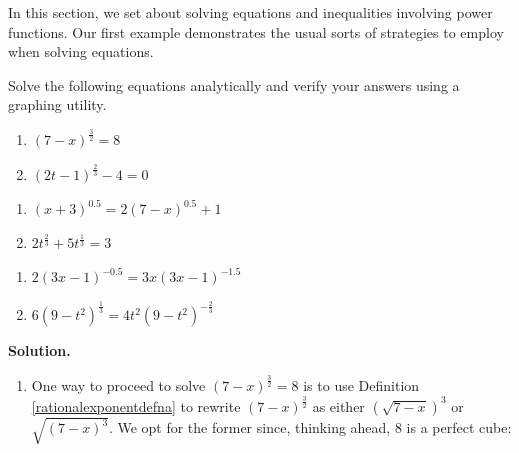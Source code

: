 

\setcounter{footnote}{0}

\label{PowerEqIneq}

In this section, we set about solving equations and inequalities involving power functions.  Our first example demonstrates the usual sorts of strategies to employ when solving equations.

\begin{ex} \label{powerequationex}  Solve the following equations analytically and verify your answers using a graphing utility.


\begin{multicols}{2}
\begin{enumerate}

\item \label{first} $(7-x)^{\frac{3}{2}} = 8$ 
\item \label{second} $(2t-1)^{\frac{2}{3}} -4 = 0$

\setcounter{HW}{\value{enumi}}
\end{enumerate}
\end{multicols}

\begin{multicols}{2}
\begin{enumerate}
\setcounter{enumi}{\value{HW}}

\item $(x+3)^{0.5} = 2(7-x)^{0.5}+1$ 
\item $2t^{\frac{2}{3}} + 5t^{\frac{1}{3}} = 3$

\setcounter{HW}{\value{enumi}}
\end{enumerate}
\end{multicols}


\begin{multicols}{2}
\begin{enumerate}
\setcounter{enumi}{\value{HW}}

\item $2(3x-1)^{-0.5}  = 3x (3x-1)^{-1.5}$ 
\item $6(9-t^2)^{\frac{1}{3}} = 4t^2 (9-t^2)^{-\frac{2}{3}}$

\setcounter{HW}{\value{enumi}}
\end{enumerate}
\end{multicols}

{\bf Solution.}

\begin{enumerate}

\item  One way to proceed to solve  $(7-x)^{\frac{3}{2}} = 8$ is to use Definition \ref{rationalexponentdefna} to rewrite $(7-x)^{\frac{3}{2}}$ as either $(\sqrt{7-x})^3$ or $\sqrt{(7-x)^3}$.  We opt for the former since, thinking ahead,  $8$ is a perfect cube: 


\end{enumerate}
\end{ex}
